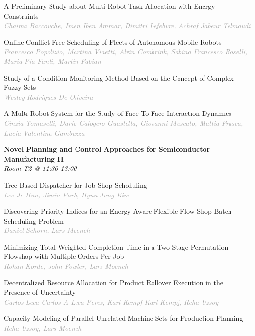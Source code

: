 \begin{multicols*}{2}
\small A Preliminary Study about Multi-Robot Task Allocation with Energy Constraints\\ 
\footnotesize \textcolor{darkgray}{\textit{Chaima Baccouche, Imen  Iben Ammar, Dimitri  Lefebvre, Achraf Jabeur  Telmoudi}}

\small Online Conflict-Free Scheduling of Fleets of Autonomous Mobile Robots\\ 
\footnotesize \textcolor{darkgray}{\textit{Francesco Popolizio, Martina  Vinetti, Alvin  Combrink, Sabino Francesco  Roselli, Maria Pia  Fanti, Martin  Fabian}}

\small Study of a Condition Monitoring Method Based on the Concept of Complex Fuzzy Sets\\ 
\footnotesize \textcolor{darkgray}{\textit{Wesley Rodrigues De Oliveira}}

\small A Multi-Robot System for the Study of Face-To-Face Interaction Dynamics\\ 
\footnotesize \textcolor{darkgray}{\textit{Cinzia Tomaselli, Dario Calogero  Guastella, Giovanni  Muscato, Mattia  Frasca, Lucia Valentina  Gambuzza}}

\normalsize \textbf{Novel Planning and Control Approaches for Semiconductor Manufacturing II}\\
\small \textit{Room T2 @ 11:30-13:00}

\small Tree-Based Dispatcher for Job Shop Scheduling\\ 
\footnotesize \textcolor{darkgray}{\textit{Lee Je-Hun, Jimin  Park, Hyun-Jung  Kim}}

\small Discovering Priority Indices for an Energy-Aware Flexible Flow-Shop Batch Scheduling Problem\\ 
\footnotesize \textcolor{darkgray}{\textit{Daniel Schorn, Lars  Moench}}

\small Minimizing Total Weighted Completion Time in a Two-Stage Permutation Flowshop with Multiple Orders Per Job\\ 
\footnotesize \textcolor{darkgray}{\textit{Rohan Korde, John  Fowler, Lars  Moench}}

\small Decentralized Resource Allocation for Product Rollover Execution in the Presence of Uncertainty\\ 
\footnotesize \textcolor{darkgray}{\textit{Carlos Leca Carlos A Leca Perez, Karl Kempf  Karl Kempf, Reha  Uzsoy}}

\small Capacity Modeling of Parallel Unrelated Machine Sets for Production Planning\\ 
\footnotesize \textcolor{darkgray}{\textit{Reha Uzsoy, Lars  Moench}}


\end{multicols*}
